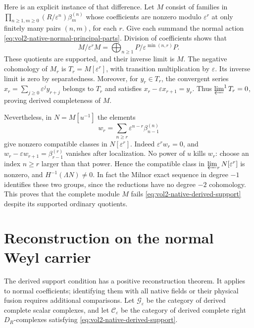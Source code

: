 Here is an explicit instance of that difference. Let \(M\) consist of
families in
\(\prod_{n\geq1,m\geq0}(R/\varepsilon^n)\beta_m^{(n)}\)
whose coefficients are nonzero modulo \(\varepsilon^r\) at only
finitely many pairs \((n,m)\), for each \(r\). Give each summand the
normal action \eqref{eq:vol2-native-normal-principal-parts}.
Division of coefficients shows that
\[
 M/\varepsilon^rM
       =\bigoplus_{n\geq1}P/\varepsilon^{\min(n,r)}P.
\]
These quotients are supported, and their inverse limit is \(M\).
The negative cohomology of \(M_r\) is
\(T_r=M[\varepsilon^r]\), with transition multiplication by
\(\varepsilon\). Its inverse limit is zero by separatedness. Moreover,
for \(y_r\in T_r\), the convergent series
\(x_r=\sum_{j\geq0}\varepsilon^jy_{r+j}\) belongs to \(T_r\) and
satisfies \(x_r-\varepsilon x_{r+1}=y_r\). Thus
\(\varprojlim^1T_r=0\), proving derived completeness of \(M\).

Nevertheless, in \(N=M[u^{-1}]\) the elements
\begin{equation}\label{eq:vol2-native-torsion-witness}
 w_r=\sum_{n\geq r}\varepsilon^{n-r}\beta_{n-1}^{(n)}
\end{equation}
give nonzero compatible classes in \(N[\varepsilon^r]\).
Indeed \(\varepsilon^rw_r=0\), and
\(w_r-\varepsilon w_{r+1}=\beta_{r-1}^{(r)}\) vanishes after
localization. No power of \(u\) kills \(w_r\): choose an index
\(n\geq r\) larger than that power. Hence the compatible class in
\(\varprojlim_rN[\varepsilon^r]\) is nonzero, and
\(H^{-1}(\Lambda N)\ne0\). In fact the Milnor exact sequence in
degree \(-1\) identifies these two groups, since the reductions have
no degree \(-2\) cohomology. This proves that the complete module
\(M\) fails \eqref{eq:vol2-native-derived-support} despite its
supported ordinary quotients.

\section{Reconstruction on the normal Weyl carrier}

The derived support condition has a positive reconstruction theorem.
It applies to normal coefficients; identifying them with all native
fields or their physical fusion requires additional comparisons.
Let \(\mathcal G_\varepsilon\) be the category of derived complete
scalar complexes, and let \(\mathcal C_\varepsilon\) be the category
of derived complete right \(D_R\)-complexes satisfying
\eqref{eq:vol2-native-derived-support}.

